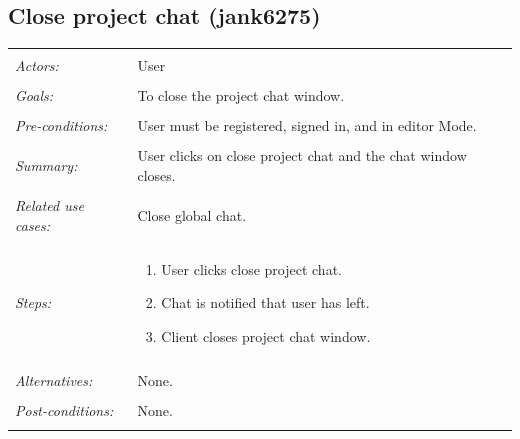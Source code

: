 \documentclass[11pt]{report}
\begin{document}
\subsection{Close project chat (jank6275)}
\begin{tabular}{ p{2cm} p{12cm} }
 \hline
 \\
 \textit{Actors:} & User \\ 
 \\
 \textit{Goals:} & To close the project chat window. \\
 \\
 \textit{Pre-conditions:} & User must be registered, signed in, and in editor Mode.  \\
 \\
 \textit{Summary:} & User clicks on close project chat and the chat window closes. \\ 
 \\
 \textit{Related use cases:} & Close global chat. \\ 
 \\
 \textit{Steps:} & \begin{enumerate}
  \item User clicks close project chat.
  \item Chat is notified that user has left.
  \item Client closes project chat window.
 \end{enumerate} \\
 \\
 \textit{Alternatives:} & None. \\
 \\
 \textit{Post-conditions:} & None. \\
 \\
\hline
\end{tabular}
\end{document}
